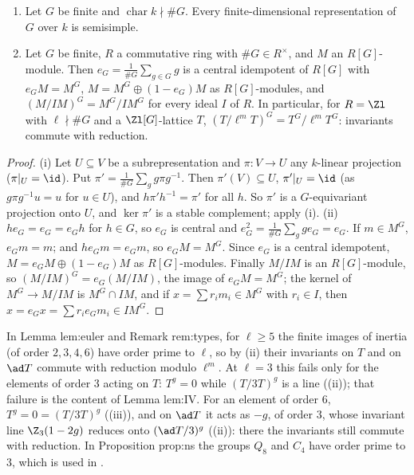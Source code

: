 \begin{theorem}[Maschke]\label{thm:reps:maschke}
\begin{enumerate}[label=(\roman*)]
\item Let $G$ be finite and $\operatorname{char}k\nmid\#G$. Every finite-dimensional representation of $G$ over $k$ is semisimple.
\item Let $G$ be finite, $R$ a commutative ring with $\#G\in R^\times$, and $M$ an $R[G]$-module. Then $e_G=\frac1{\#G}\sum_{g\in G}g$ is a central idempotent of
$R[G]$ with $e_GM=M^G$, $M=M^G\oplus(1-e_G)M$ as $R[G]$-modules, and $(M/IM)^G=M^G/IM^G$ for every ideal $I$ of $R$. In particular, for $R=\Zl$
with $\ell\nmid\#G$ and a $\Zl[G]$-lattice $T$, $(T/\ell^mT)^G=T^G/\ell^mT^G$: invariants commute with reduction.
\end{enumerate}
\end{theorem}

\begin{proof}
(i) Let $U\subseteq V$ be a subrepresentation and $\pi\colon V\to U$ any $k$-linear projection ($\pi|_U=\id$). Put $\pi'=\frac1{\#G}\sum_gg\pi g^{-1}$. Then
$\pi'(V)\subseteq U$, $\pi'|_U=\id$ (as $g\pi g^{-1}u=u$ for $u\in U$), and $h\pi'h^{-1}=\pi'$ for all $h$. So $\pi'$ is a $G$-equivariant projection
onto $U$, and $\ker\pi'$ is a stable complement; apply (i).
(ii) $he_G=e_G=e_Gh$ for $h\in G$, so $e_G$ is central and $e_G^2=\frac1{\#G}\sum_gge_G=e_G$. If $m\in M^G$, $e_Gm=m$; and $he_Gm=e_Gm$, so
$e_GM=M^G$. Since $e_G$ is a central idempotent, $M=e_GM\oplus(1-e_G)M$ as $R[G]$-modules. Finally $M/IM$ is an $R[G]$-module, so
$(M/IM)^G=e_G(M/IM)$, the image of $e_GM=M^G$; the kernel of $M^G\to M/IM$ is $M^G\cap IM$, and if $x=\sum r_im_i\in M^G$ with $r_i\in I$, then
$x=e_Gx=\sum r_ie_Gm_i\in IM^G$.
\end{proof}

\begin{paperlink}
In Lemma lem:euler and Remark rem:types, for $\ell\ge5$ the finite images of inertia (of order $2,3,4,6$) have order prime to $\ell$, so by (ii)
their invariants on $T$ and on $\ad T$ commute with reduction modulo $\ell^m$. At $\ell=3$ this fails only for the elements of order $3$ acting on $T$:
$T^g=0$ while $(T/3T)^g$ is a line ((ii)); that failure is the content of Lemma lem:IV. For an element of
order $6$, $T^g=0=(T/3T)^g$ ((iii)), and on $\ad T$ it acts as $-g$, of order $3$, whose invariant line
$\Z_3(1-2g)$ reduces onto $(\ad T/3)^g$ ((ii)): there the invariants still commute with reduction. In Proposition prop:ns the groups $Q_8$ and $C_4$ have order
prime to $3$, which is used in .
\end{paperlink}

